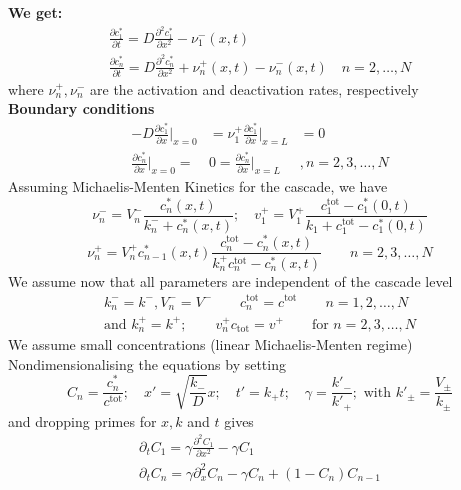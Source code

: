 \noindent\textbf{We get:}
\begin{align*}
	\frac{\partial c_1^\ast}{\partial t}=D\frac{\partial^2 c_1^\ast}{\partial x^2}-\nu_1^-(x,t)\\
	\frac{\partial c_n^\ast}{\partial t}=D\frac{\partial^2 c_n^\ast}{\partial x^2}+\nu_n^+(x,t)-\nu_n^-(x,t)\quad n=2,\ldots ,N
\end{align*}
where $\nu_n^+,\nu_n^-$ are the activation and deactivation rates, respectively\vspace{0.1cm}\\
\textbf{Boundary conditions}
\begin{align*}
	-D\frac{\partial c^\ast_1}{\partial x}\Big|_{x=0}&=\nu_1^+ \frac{\partial c_1^\ast}{\partial x}\Big|_{x=L}&=0\\
	\frac{\partial c_n^\ast}{\partial x}\Big|_{x=0}=&0=\frac{\partial c_n^\ast}{\partial x}\Big|_{x=L} &,n=2,3,\ldots ,N
\end{align*}
Assuming Michaelis-Menten Kinetics for the cascade, we have
\begin{equation*}
	\nu_n^-=V_n^-\frac{c_n^\ast(x,t)}{k_n^-+c_n^\ast(x,t)};\quad v_1^+=V_1^+ \frac{c_1^\text{tot}-c_1^{\ast}(0,t)}{k_1+c_1^\text{tot}-c_1^\ast(0,t)}
\end{equation*}
\begin{equation*}
	\nu_n^+=V_n^+c_{n-1}^\ast(x,t)\frac{c_n^\text{tot}-c_n^\ast(x,t)}{k_n^+c_n^\text{tot}-c_n^\ast(x,t)}\qquad n=2,3,\ldots ,N
\end{equation*}
We assume now that all parameters are independent of the cascade level
\begin{align*}
	k_n^-=k^-,V_n^-=V^-\qquad c_n^\text{tot}=c^\text{tot}\qquad n=1,2,\ldots ,N\\
	\text{and } k_n^+=k^+;\qquad v_n^+c_\text{tot}=v^+ \qquad \text{for } n=2,3,\ldots ,N
\end{align*}
We assume small concentrations (linear Michaelis-Menten regime)\\
Nondimensionalising the equations by setting
\begin{equation*}
	C_n=\frac{c_n^\ast}{c^\text{tot}};\quad x'=\sqrt{\frac{k_-}{D}}x;\quad t'=k_+t;\quad \gamma=\frac{k'_-}{k'_+}; \text{ with } k'_\pm=\frac{V_\pm}{k_\pm}
\end{equation*}
and dropping primes for $x,k$ and $t$ gives
\begin{align*}
	\partial_t C_1=\gamma\frac{\partial^2 C_1}{\partial x^2}-\gamma C_1\\
	\partial_t C_n=\gamma \partial_x^2C_n-\gamma C_n+(1-C_n)C_{n-1}
\end{align*}

